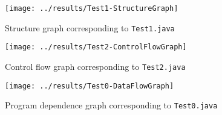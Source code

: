 \documentclass[submission,copyright,creativecommons]{eptcs}
\begin{document}
\begin{figure}[h!]
  \centering
  \texttt{[image: ../results/Test1-StructureGraph]}
  \caption{Structure graph corresponding to \texttt{Test1.java}}
  \label{fig:sg-test1}
\end{figure}

\begin{figure}[h!]
  \centering
  \texttt{[image: ../results/Test2-ControlFlowGraph]}
  \caption{Control flow graph corresponding to \texttt{Test2.java}}
  \label{fig:cfg-test2}
\end{figure}

\begin{figure}[h!]
  \centering
  \texttt{[image: ../results/Test0-DataFlowGraph]}
  \caption{Program dependence graph corresponding to \texttt{Test0.java}}
  \label{fig:pdg-test0}
\end{figure}
\end{document}
